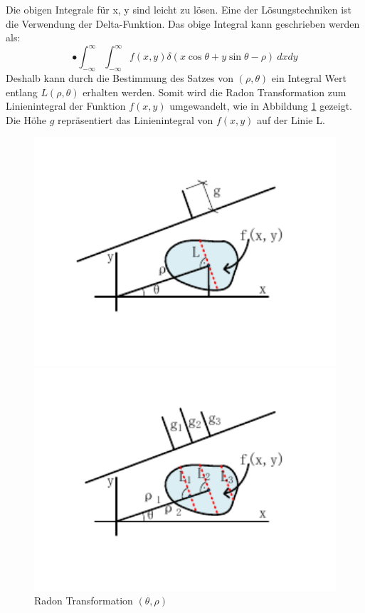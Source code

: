 Die obigen Integrale für x, y sind leicht zu lösen. Eine der Lösungstechniken ist die Verwendung der Delta-Funktion. Das obige Integral kann geschrieben werden als:
\begin{equation}
•  \int_{-\infty}^{\infty} \int_{-\infty}^{\infty} f(x,y)\delta (x\cos{\theta} + y\sin{\theta}-\rho)\ dxdy
\end{equation} 
Deshalb kann durch die Bestimmung des Satzes von $ (\rho,\theta) $ ein Integral Wert entlang $ L(\rho,\theta) $ erhalten werden. Somit wird die Radon Transformation zum Linienintegral der Funktion $ f(x,y) $ umgewandelt, wie in Abbildung \ref{fig:Radon Transformation als Linienintegral} gezeigt. Die Höhe $ g $ repräsentiert das Linienintegral von $ f(x,y) $ auf der Linie L.

\begin{figure}[H]
\centering 
\begin{minipage}[b]{0.49\textwidth} 
\centering 
\includegraphics[width=1.0\textwidth]{images/4_ZweiteErfahrung/Radon/3.pdf} 
\caption{Radon Transformation $(\theta,\rho)$}
\label{fig:Radon Transformation als Linienintegral}
\end{minipage}
\begin{minipage}[b]{0.49\textwidth} 
\centering 
\includegraphics[width=1.0\textwidth]{images/4_ZweiteErfahrung/Radon/4.pdf}

\end{minipage}
\end{figure}
